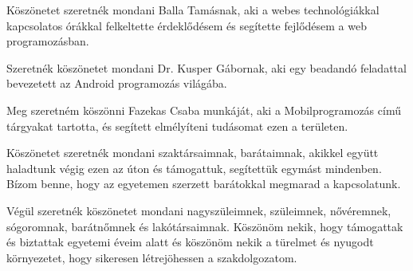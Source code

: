 \documentclass[
]{thesis-ekf}
\theoremstyle{definition}
\theoremstyle{remark}
\begin{document}
	Köszönetet szeretnék mondani Balla Tamásnak, aki a webes technológiákkal kapcsolatos órákkal felkeltette érdeklődésem és segítette fejlődésem a web programozásban.
	
	Szeretnék köszönetet mondani Dr. Kusper Gábornak, aki egy beadandó feladattal bevezetett az Android programozás világába.
	
	Meg szeretném köszönni Fazekas Csaba munkáját, aki a Mobilprogramozás című tárgyakat tartotta, és segített elmélyíteni tudásomat ezen a területen.
	
	Köszönetet szeretnék mondani szaktársaimnak, barátaimnak, akikkel együtt haladtunk végig ezen az úton és támogattuk, segítettük egymást mindenben. Bízom benne, hogy az egyetemen szerzett barátokkal megmarad a kapcsolatunk. 
	
	Végül szeretnék köszönetet mondani nagyszüleimnek, szüleimnek, nővéremnek, sógoromnak, barátnőmnek és lakótársaimnak. Köszönöm nekik, hogy támogattak és biztattak egyetemi éveim alatt és köszönöm nekik a türelmet és nyugodt környezetet, hogy sikeresen létrejöhessen a szakdolgozatom.
	
\end{document}
